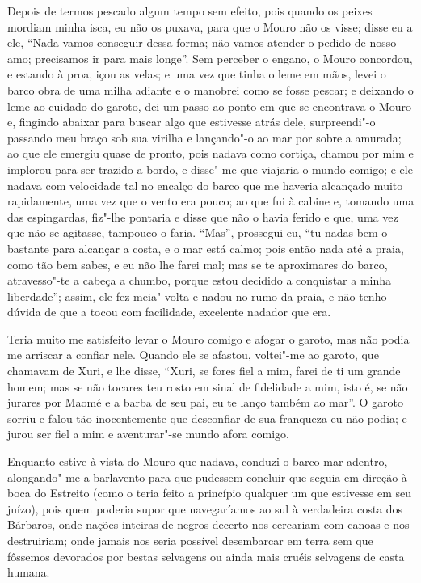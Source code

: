 Depois de termos pescado algum tempo sem efeito, pois quando os peixes
mordiam minha isca, eu não os puxava, para que o Mouro não os visse;
disse eu a ele, ``Nada vamos conseguir dessa forma; não vamos atender o
pedido de nosso amo; precisamos ir para mais longe''. Sem perceber o
engano, o Mouro concordou, e estando à proa, içou as velas; e uma vez
que tinha o leme em mãos, levei o barco obra de uma milha adiante e o
manobrei como se fosse pescar; e deixando o leme ao cuidado do garoto,
dei um passo ao ponto em que se encontrava o Mouro e, fingindo abaixar
para buscar algo que estivesse atrás dele, surpreendi"-o passando meu
braço sob sua virilha e lançando"-o ao mar por sobre a amurada; ao que
ele emergiu quase de pronto, pois nadava como cortiça, chamou por mim e
implorou para ser trazido a bordo, e disse"-me que viajaria o mundo
comigo; e ele nadava com velocidade tal no encalço do barco que me
haveria alcançado muito rapidamente, uma vez que o vento era pouco; ao
que fui à cabine e, tomando uma das espingardas, fiz"-lhe pontaria e
disse que não o havia ferido e que, uma vez que não se agitasse,
tampouco o faria. ``Mas'', prossegui eu, ``tu nadas bem o bastante para
alcançar a costa, e o mar está calmo; pois então nada até a praia, como
tão bem sabes, e eu não lhe farei mal; mas se te aproximares do barco,
atravesso"-te a cabeça a chumbo, porque estou decidido a conquistar a
minha liberdade''; assim, ele fez meia"-volta e nadou no rumo da praia, e
não tenho dúvida de que a tocou com facilidade, excelente nadador que
era.

Teria muito me satisfeito levar o Mouro comigo e afogar o garoto, mas
não podia me arriscar a confiar nele. Quando ele se afastou, voltei"-me
ao garoto, que chamavam de Xuri, e lhe disse, ``Xuri, se fores fiel a
mim, farei de ti um grande homem; mas se não tocares teu rosto em sinal
de fidelidade a mim, isto é, se não jurares por Maomé e a barba de seu
pai, eu te lanço também ao mar''. O garoto sorriu e falou tão
inocentemente que desconfiar de sua franqueza eu não podia; e jurou ser
fiel a mim e aventurar"-se mundo afora comigo.

Enquanto estive à vista do Mouro que nadava, conduzi o barco mar
adentro, alongando"-me a barlavento para que pudessem concluir que seguia
em direção à boca do Estreito (como o teria feito a princípio qualquer
um que estivesse em seu juízo), pois quem poderia supor que navegaríamos
ao sul à verdadeira costa dos Bárbaros, onde nações inteiras de negros
decerto nos cercariam com canoas e nos destruiriam; onde jamais nos
seria possível desembarcar em terra sem que fôssemos devorados por
bestas selvagens ou ainda mais cruéis selvagens de casta humana.

